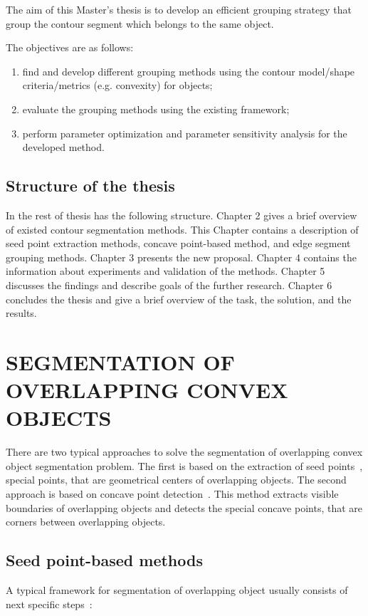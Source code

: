 \documentclass{lutmscthesis}[2010/09/22]
\begin{document}
 The aim of this Master’s thesis is to develop an efficient grouping strategy that group the contour segment which belongs to the same object.


The objectives are as follows:
\begin{enumerate}
\item find and develop different grouping methods using the contour model/shape criteria/metrics (e.g. convexity) for objects;
\item evaluate the grouping methods using the existing framework;
\item perform parameter optimization and parameter sensitivity analysis for the developed method.
\end{enumerate}



\subsection{Structure of the thesis}

In the rest of thesis has the following structure. Chapter 2 gives a brief overview of existed contour segmentation methods. This Chapter contains a description of seed point extraction methods, concave point-based method, and edge segment grouping methods. Chapter 3 presents the new proposal. Chapter 4 contains the information about experiments and validation of the methods. Chapter 5 discusses the findings and describe goals of the further research. Chapter 6 concludes the thesis and give a brief overview of the task, the solution, and the results.


\section{SEGMENTATION OF OVERLAPPING CONVEX OBJECTS}
\label{sec:related}
There are two typical approaches to solve the segmentation of overlapping convex object segmentation problem. The first is based on the extraction of seed points~\cite{zafari-thesis}, special points, that are geometrical centers of overlapping objects. The second approach is based on concave point detection~\cite{Zafari15}. This method extracts visible boundaries of overlapping objects and detects the special concave points, that are corners between overlapping objects.  

\subsection{Seed point-based methods}
A typical framework for segmentation of overlapping object usually consists of next specific steps~\cite{zafari-thesis}:
\end{document}
